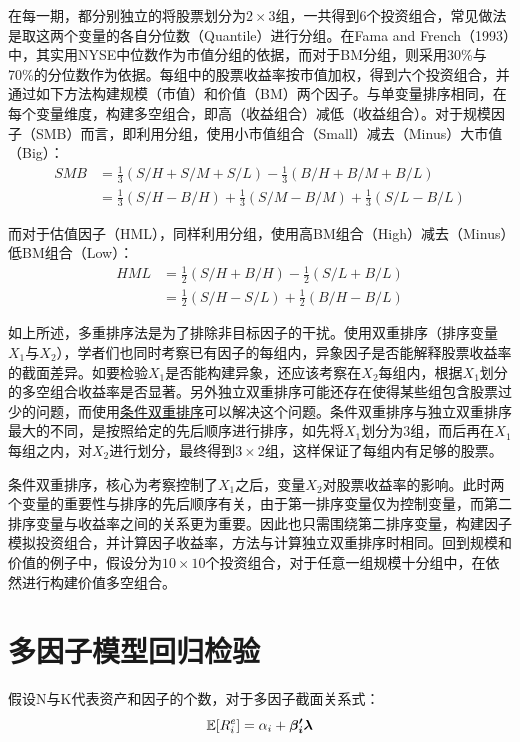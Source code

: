 \documentclass[11pt]{article}
\begin{document}
在每一期，都分别独立的将股票划分为$2 \times 3$组，一共得到6个投资组合，常见做法是取这两个变量的各自分位数（Quantile）进行分组。在Fama and French（1993）中，其实用NYSE中位数作为市值分组的依据，而对于BM分组，则采用30\%与70\%的分位数作为依据。每组中的股票收益率按市值加权，得到六个投资组合，并通过如下方法构建规模（市值）和价值（BM）两个因子。与单变量排序相同，在每个变量维度，构建多空组合，即高（收益组合）减低（收益组合）。对于规模因子（SMB）而言，即利用分组，使用小市值组合（Small）减去（Minus）大市值（Big）：
\begin{align*}
    SMB &= \frac{1}{3}(S/H + S/M + S/L) - \frac{1}{3}(B/H + B/M + B/L) \\
    &= \frac{1}{3}(S/H-B/H) + \frac{1}{3}(S/M-B/M) + \frac{1}{3}(S/L-B/L)
\end{align*}

而对于估值因子（HML），同样利用分组，使用高BM组合（High）减去（Minus）低BM组合（Low）：
\begin{align*}
    HML &=  \frac{1}{2}(S/H + B/H) - \frac{1}{2}(S/L + B/L) \\
    &= \frac{1}{2}(S/H-S/L) + \frac{1}{2}(B/H-B/L)
\end{align*}

如上所述，多重排序法是为了排除非目标因子的干扰。使用双重排序（排序变量$X_1$与$X_2$），学者们也同时考察已有因子的每组内，异象因子是否能解释股票收益率的截面差异。如要检验$X_1$是否能构建异象，还应该考察在$X_2$每组内，根据$X_1$划分的多空组合收益率是否显著。另外独立双重排序可能还存在使得某些组包含股票过少的问题，而使用\uline{条件双重排序}可以解决这个问题。条件双重排序与独立双重排序最大的不同，是按照给定的先后顺序进行排序，如先将$X_1$划分为3组，而后再在$X_1$每组之内，对$X_2$进行划分，最终得到$3\times 2$组，这样保证了每组内有足够的股票。

条件双重排序，核心为考察控制了$X_1$之后，变量$X_2$对股票收益率的影响。此时两个变量的重要性与排序的先后顺序有关，由于第一排序变量仅为控制变量，而第二排序变量与收益率之间的关系更为重要。因此也只需围绕第二排序变量，构建因子模拟投资组合，并计算因子收益率，方法与计算独立双重排序时相同。回到规模和价值的例子中，假设分为$10 \times 10$个投资组合，对于任意一组规模十分组中，在依然进行构建价值多空组合。

\section{多因子模型回归检验}

假设N与K代表资产和因子的个数，对于多因子截面关系式：
\begin{equation*}
    \mathbb{E}[R_{i}^{e}] = \alpha_i + \bm{\beta_{i}' \lambda}
\end{equation*}
\end{document}
